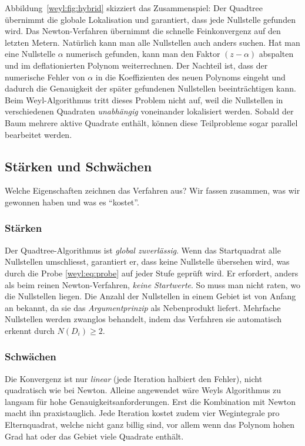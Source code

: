 Abbildung~\ref{weyl:fig:hybrid} skizziert das Zusammenspiel:
Der Quadtree übernimmt die globale Lokalisation und garantiert, dass jede Nullstelle
gefunden wird. Das Newton-Verfahren übernimmt die schnelle Feinkonvergenz auf den
letzten Metern.
Natürlich kann man alle Nullstellen auch anders suchen. Hat man eine Nullstelle
$\alpha$ numerisch gefunden, kann man den Faktor $(z-\alpha)$ abspalten und im
deflationierten Polynom weiterrechnen. Der Nachteil ist, dass der numerische Fehler
von $\alpha$ in die Koeffizienten des neuen Polynoms eingeht und dadurch die
Genauigkeit der später gefundenen Nullstellen beeinträchtigen kann.
Beim Weyl-Algorithmus tritt dieses Problem nicht auf, weil die Nullstellen in
verschiedenen Quadraten \emph{unabhängig} voneinander lokalisiert werden. Sobald der
Baum mehrere aktive Quadrate enthält, können diese Teilprobleme sogar parallel
bearbeitet werden.

\subsection{Stärken und Schwächen%
\label{weyl:subsection:einordnung}}
Welche Eigenschaften zeichnen das Verfahren aus?
Wir fassen zusammen, was wir gewonnen haben und was es ``kostet''.

\subsubsection*{Stärken}
Der Quadtree-Algorithmus ist \emph{global zuverlässig}.
Wenn das Startquadrat alle Nullstellen umschliesst, garantiert er, dass keine Nullstelle
übersehen wird, was durch die Probe \eqref{weyl:eq:probe} auf jeder Stufe geprüft wird.
Er erfordert, anders als beim reinen Newton-Verfahren, \emph{keine Startwerte}. 
So muss man nicht raten, wo die Nullstellen liegen.
Die Anzahl der Nullstellen in einem Gebiet ist von Anfang an bekannt, da sie das
\emph{Argumentprinzip} als Nebenprodukt liefert.
Mehrfache Nullstellen werden zwanglos behandelt, indem das Verfahren sie
automatisch erkennt durch $N(D_i) \geq 2$.

\subsubsection*{Schwächen}
Die Konvergenz ist nur \emph{linear} (jede Iteration halbiert den Fehler), nicht
quadratisch wie bei Newton.
Alleine angewendet wäre Weyls Algorithmus zu langsam für hohe Genauigkeitsanforderungen.
Erst die Kombination mit Newton macht ihn praxistauglich.
Jede Iteration kostet zudem vier Wegintegrale pro Elternquadrat, welche nicht ganz
billig sind, vor allem wenn das Polynom hohen Grad hat oder das Gebiet viele Quadrate
enthält.

